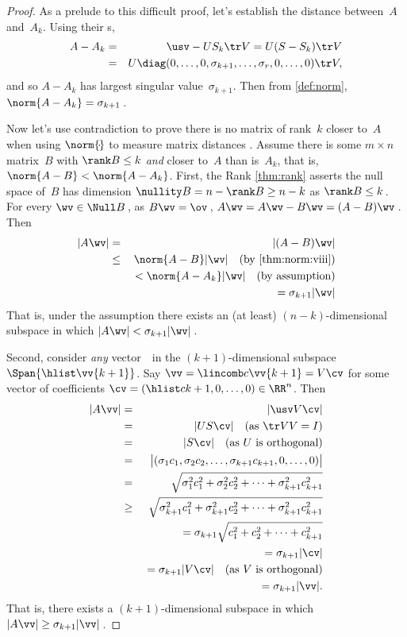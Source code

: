 \begin{proof} 
As a prelude to this difficult proof, let's establish the distance between~\(A\) and~\(A_k\). 
Using their \svd{}s,
\begin{eqnarray*}
A-A_k&=&\usv-US_k\tr V=U(S-S_k)\tr V
\\&=&U\diag(0,\ldots,0,\sigma_{k+1},\ldots,\sigma_r,0,\ldots,0)\tr V,
\end{eqnarray*}
and so \(A-A_k\) has largest singular value~\(\sigma_{k+1}\).
Then from \autoref{def:norm}, \(\norm{A-A_k}=\sigma_{k+1}\)\,.

Now let's use contradiction to prove there is no matrix of rank~\(k\) closer to~\(A\) when using \(\norm{\cdot}\) to measure matrix distances \cite[p.36]{Trefethen1997}.
Assume there is some \(m\times n\) matrix~\(B\) with \(\rank B\leq k\) \emph{and}  closer to~\(A\) than is~\(A_k\), that is, \(\norm{A-B}<\norm{A-A_k}\).
First, the Rank \autoref{thm:rank} asserts the null space of~\(B\) has dimension \(\nullity B =n-\rank B\geq n-k\) as  \(\rank B\leq k\)\,.
For every \(\wv\in\Null B\)\,,  as \(B\wv=\ov\)\,,  \(A\wv=A\wv-B\wv=(A-B)\wv\)\,. 
Then
\begin{eqnarray*}
|A\wv|&=&|(A-B)\wv|
\\&\leq&\norm{A-B}|\wv| 
\quad(\text{by \autoref{thm:norm:viii}})
\\&&{}<\norm{A-A_k}|\wv|
\quad(\text{by assumption})
\\&&\phantom{{}<}{}=\sigma_{k+1}|\wv|
\end{eqnarray*}
That is, under the assumption there exists an (at least) \((n-k)\)-dimensional subspace in which \(|A\wv|<\sigma_{k+1}|\wv|\)\,.

Second, consider \emph{any} vector~\vv\ in the \((k+1)\)-dimensional subspace \(\Span\{\hlist\vv{k+1}\}\).
Say \(\vv=\lincomb c\vv{k+1}=V\cv\) for some vector of coefficients \(\cv=(\hlist c{k+1},0,\ldots,0)\in\RR^n\).
Then
\begin{eqnarray*}
|A\vv|&=&|\usv V\cv|
\\&=&|US\cv| \quad(\text{as }\tr VV=I)
\\&=&|S\cv| \quad(\text{as \(U\) is orthogonal})
\\&=&\big|(\sigma_1c_1,\sigma_2c_2,\ldots,\sigma_{k+1}c_{k+1},0,\ldots,0)\big|
\\&=&\sqrt{\sigma_1^2c_1^2+\sigma_2^2c_2^2+\cdots+\sigma_{k+1}^2c_{k+1}^2}
\\&\geq&\sqrt{\sigma_{k+1}^2c_1^2+\sigma_{k+1}^2c_2^2+\cdots+\sigma_{k+1}^2c_{k+1}^2}
\\&&{}=\sigma_{k+1}\sqrt{c_1^2+c_2^2+\cdots+c_{k+1}^2}
\\&&{}=\sigma_{k+1}|\cv|
\\&&{}=\sigma_{k+1}|V\cv|\quad(\text{as \(V\) is orthogonal})
\\&&{}=\sigma_{k+1}|\vv|.
\end{eqnarray*}
That is, there exists a \((k+1)\)-dimensional subspace in which \(|A\vv|\geq\sigma_{k+1}|\vv|\)\,.


\end{proof}
